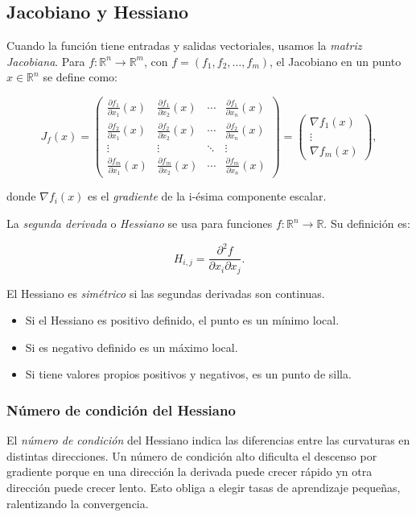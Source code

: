 \subsection{Jacobiano y Hessiano}

Cuando la función tiene entradas y salidas vectoriales, usamos la \emph{matriz Jacobiana}. Para \( f : \mathbb{R}^n \to \mathbb{R}^m \), con \( f = (f_1, f_2, \ldots, f_m) \), el Jacobiano en un punto \( x \in \mathbb{R}^n \) se define como:

\[
J_f(x) = 
\begin{pmatrix}
\frac{\partial f_1}{\partial x_1}(x) & \frac{\partial f_1}{\partial x_2}(x) & \cdots & \frac{\partial f_1}{\partial x_n}(x) \\
\frac{\partial f_2}{\partial x_1}(x) & \frac{\partial f_2}{\partial x_2}(x) & \cdots & \frac{\partial f_2}{\partial x_n}(x) \\
\vdots & \vdots & \ddots & \vdots \\
\frac{\partial f_m}{\partial x_1}(x) & \frac{\partial f_m}{\partial x_2}(x) & \cdots & \frac{\partial f_m}{\partial x_n}(x)
\end{pmatrix}
=
\begin{pmatrix}
\nabla f_1(x) \\
\vdots \\
\nabla f_m(x)
\end{pmatrix},
\]

donde \(\nabla f_i(x)\) es el \emph{gradiente} de la i-ésima componente escalar.

La \emph{segunda derivada} o \emph{Hessiano} se usa para funciones \( f : \mathbb{R}^n \to \mathbb{R} \). Su definición es:

\[
H_{i,j} = \frac{\partial^2 f}{\partial x_i \partial x_j}.
\]

El Hessiano es \emph{simétrico} si las segundas derivadas son continuas.

\begin{itemize}
  \item Si el Hessiano es positivo definido, el punto es un mínimo local.
  \item Si es negativo definido es un máximo local.
  \item Si tiene valores propios positivos y negativos, es un punto de silla.
\end{itemize}


\subsubsection{Número de condición del Hessiano}
El \emph{número de condición} del Hessiano indica las diferencias entre las curvaturas en distintas direcciones. Un número de condición alto dificulta el descenso por gradiente porque en una dirección la derivada puede crecer rápido yn otra dirección puede crecer lento. Esto obliga a elegir tasas de aprendizaje pequeñas, ralentizando la convergencia.

